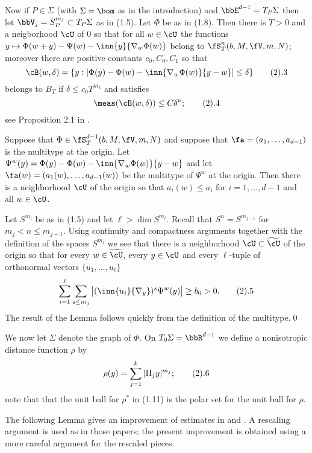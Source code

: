 Now if
 $P\in \Sigma$ (with $\Sigma=\bom$ as in the introduction) and
$\bbE^{d-1}=T_P\Sigma$ 
then let $\bbV_j=S^{m_j}_P\subset T_P\Sigma$ as in  (1.5).
 Let $\Phi$ be as in (1.8). Then there is $T>0$ and a neigborhood $\cU$ of 
$0$ so that for all $w\in \cU$
 the functions $y\mapsto \Phi(w+y)-\Psi(w)- \inn{y}{\nabla_{w}\Phi(w)}$ 
 belong to $\fS_T^n(b,M,\fV, m,N)$; moreover there are positive constants 
$c_0,C_0, C_1$ so that 
$$\cB(w,\delta)= \{y: |\Phi(y)-\Phi(w)-\inn{\nabla_w \Phi(w)}{y-w}|\le \delta
\}
\tag 2.3$$
belongs to $B_T$ if $\delta\le c_0 T^{m_k}$ and satisfies
$$\meas(\cB(w,\delta))\le C\delta^{\nu};\tag 2.4$$
see Proposition 2.1  in \cite{17}.



 Suppose that $\Phi
\in\fS_T^{d-1}(b,M,\fV, m,N)$ and suppose that $\fa=(a_1,\dots, a_{d-1})$
is the multitype at the origin. 
Let $\Psi^w(y)=\Phi(y)-\Phi(w)-\inn{\nabla_w \Phi(w)}{y-w}$ and 
let $\fa(w)= (a_1(w),\dots, a_{d-1}(w))$ be the multitype of 
$\Psi^w$ at the origin. Then there is a neighborhood $\cU$ of the origin so 
that  $a_i(w)\le a_i$ for $i=1,\dots, d-1$ and  all 
$w\in\cU$.
\endproclaim

 Let $S^{m_i} $ be as in (1.5) and let  $\ell>\dim S^{m_i}$. Recall that $S^{n}=S^{m_{j-1}}$ for $m_j<n\le m_{j-1}$.
Using continuity and compactness arguments together with the definition of 
the spaces $S^{m_i}$   we see that there  is a   
  neighborhood $\cU\subset \widetilde \cU$ of the origin  so that for every 
$w\in \widetilde \cU$, every $y\in \cU$  and every 
$\ell$-tuple of orthonormal vectors 
$\{u_1,\dots, u_\ell\}$
$$
\sum_{i=1}^\ell \sum_{s\le m_j}\big|(\inn{u_i}{\nabla_y})^s\Psi^w(y)\big|\ge b_0>0.
\tag 2.5
$$
The result of the Lemma follows quickly from the definition of 
the multitype.\qed
\enddemo

We now let $\Sigma$ denote the graph of $\Phi$. On $T_0\Sigma=\bbR^{d-1}$ we define a nonisotropic  distance function $\rho$ by
$$
\rho(y)=
\sum_{j=1}^k 
|\Pi_jy|^{m_j};
\tag 2.6
$$
note that that the unit ball for $\rho^*$ in (1.11) is the polar set for 
the unit ball  for $\rho$.

 The following Lemma gives an improvement of estimates in 
\cite{16} and  \cite{17}.  A rescaling argument is used
as in those papers; the present improvement  is obtained using
a more careful argument for the rescaled pieces.



